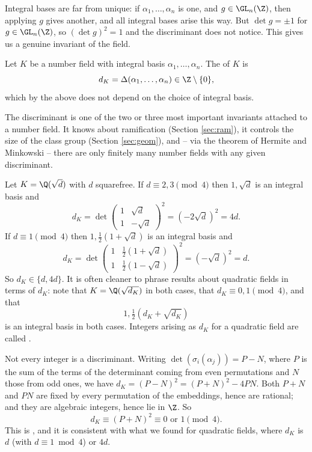 Integral bases are far from unique: if $\alpha_1, \dots, \alpha_n$ is one, and $g \in \GL_n(\Z)$, then applying $g$ gives another, and all integral bases arise this way. But $\det g = \pm 1$ for $g \in \GL_n(\Z)$, so $(\det g)^2 = 1$ and the discriminant does not notice. This gives us a genuine invariant of the field.

\begin{definition}
	Let $K$ be a number field with integral basis $\alpha_1, \dots, \alpha_n$. The  of $K$ is
	$$d_K = \Delta(\alpha_1, \dots, \alpha_n) \in \Z \setminus \{0\},$$
	which by the above does not depend on the choice of integral basis.
\end{definition}

The discriminant is one of the two or three most important invariants attached to a number field. It knows about ramification (Section \ref{sec:ram}), it controls the size of the class group (Section \ref{sec:geom}), and -- via the theorem of Hermite and Minkowski -- there are only finitely many number fields with any given discriminant.

\begin{example}\label{ex:quaddisc}
	Let $K = \Q(\sqrt d)$ with $d$ squarefree. If $d \equiv 2,3 \pmod 4$ then $1, \sqrt d$ is an integral basis and
	$$d_K = \det\begin{pmatrix} 1 & \sqrt d \\ 1 & -\sqrt d\end{pmatrix}^2 = (-2\sqrt d)^2 = 4d.$$
	If $d \equiv 1 \pmod 4$ then $1, \tfrac12(1+\sqrt d)$ is an integral basis and
	$$d_K = \det\begin{pmatrix} 1 & \tfrac12(1+\sqrt d) \\ 1 & \tfrac12(1 - \sqrt d)\end{pmatrix}^2 = (-\sqrt d)^2 = d.$$
	So $d_K \in \{d, 4d\}$. It is often cleaner to phrase results about quadratic fields in terms of $d_K$: note that $K = \Q(\sqrt{d_K})$ in both cases, that $d_K \equiv 0, 1 \pmod 4$, and that
	$$1, \tfrac12\left(d_K + \sqrt{d_K}\right)$$
	is an integral basis in both cases. Integers arising as $d_K$ for a quadratic field are called .
\end{example}

\begin{remark}[Stickelberger]
	Not every integer is a discriminant. Writing $\det(\sigma_i(\alpha_j)) = P - N$, where $P$ is the sum of the terms of the determinant coming from even permutations and $N$ those from odd ones, we have $d_K = (P-N)^2 = (P+N)^2 - 4PN$. Both $P+N$ and $PN$ are fixed by every permutation of the embeddings, hence are rational; and they are algebraic integers, hence lie in $\Z$. So
	$$d_K \equiv (P+N)^2 \equiv 0 \text{ or } 1 \pmod 4.$$
	This is , and it is consistent with what we found for quadratic fields, where $d_K$ is $d$ (with $d \equiv 1 \bmod 4$) or $4d$.
\end{remark}

